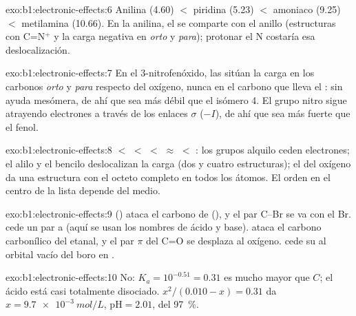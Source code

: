 \begin{solution}{exo:b1:electronic-effects:6}
Anilina (4.60) $<$ piridina (5.23) $<$ amoniaco (9.25) $<$ metilamina
(10.66). En la anilina, el  se comparte con el anillo
(estructuras con C=N$^+$ y la carga negativa en \textit{orto} y
\textit{para}); protonar el N costaría esa deslocalización.
\end{solution}

\begin{solution}{exo:b1:electronic-effects:7}
En el 3-nitrofenóxido, las  sitúan la carga en los
carbonos \textit{orto} y \textit{para} respecto del oxígeno, nunca en el
carbono que lleva el : sin ayuda mesómera, de ahí que sea más
débil que el isómero 4. El grupo nitro sigue atrayendo electrones a
través de los enlaces $\sigma$ ($-I$), de ahí que sea más fuerte que el
fenol.
\end{solution}

\begin{solution}{exo:b1:electronic-effects:8}
 $<$  $<$  $<$ 
$\approx$  $<$ : los grupos alquilo ceden
electrones; el alilo y el bencilo deslocalizan la carga (dos y cuatro
estructuras); el  del oxígeno da una estructura con el
octeto completo en todos los átomos. El orden en el centro de la lista
depende del medio.
\end{solution}

\begin{solution}{exo:b1:electronic-effects:9}
 () ataca el carbono de  (), y el
par C--Br se va con el Br.  cede un par a  (aquí se usan
los nombres de ácido y base).  ataca el carbono carbonílico del
etanal, y el par $\pi$ del C=O se desplaza al oxígeno.  cede su
 al orbital vacío del boro en .
\end{solution}

\begin{solution}{exo:b1:electronic-effects:10}
No: $K_a = 10^{-0.51} = 0.31$ es mucho mayor que $C$; el ácido está casi
totalmente disociado. $x^2/(0.010 - x) = 0.31$ da $x = \qty{9.7e-3}{mol/L}$,
$\mathrm{pH} = 2.01$,  del \qty{97}{\percent}.
\end{solution}


